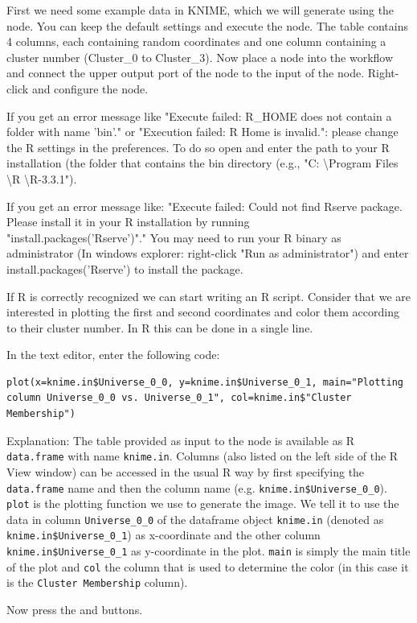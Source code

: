 \begin{task}
First we need some example data in KNIME, which we will generate using the  node. You can keep the default settings and execute the node. The table contains 4 columns, each containing random coordinates and one column containing a cluster number (Cluster\_0 to Cluster\_3). Now place a  node into the workflow and connect the upper output port of the  node to the input of the  node.
Right-click and configure the node.

If you get an error message like "Execute failed: R\_HOME does not contain a folder with name 'bin'." or "Execution failed: R Home is invalid.": please change the R settings in the preferences. To do so open  and enter the path to your R installation (the folder that contains the bin directory (e.g., "C: \textbackslash Program Files \textbackslash R \textbackslash R-3.3.1").

If you get an error message like:
"Execute failed: Could not find Rserve package. Please install it in your R installation by running \\ "install.packages('Rserve')"." You may need to run your R binary as administrator (In windows explorer: right-click "Run as administrator") and enter install.packages('Rserve') to install the package.

If R is correctly recognized we can start writing an R script. Consider that we are interested in plotting the first and second coordinates and color them according to their cluster number. In R this can be done in a single line.

In the  text editor, enter the following code:
\begin{lstlisting}
plot(x=knime.in$Universe_0_0, y=knime.in$Universe_0_1, main="Plotting column Universe_0_0 vs. Universe_0_1", col=knime.in$"Cluster Membership")
\end{lstlisting}
        
Explanation:
The table provided as input to the  node is available as R \texttt{data.frame} with name \texttt{knime.in}. Columns (also listed on the left side of the R View window) can be accessed in the usual R way by first specifying the \texttt{data.frame} name and then the column name (e.g. \texttt{knime.in\$Universe\_0\_0}).
\texttt{plot} is the plotting function we use to generate the image. We tell it to use the data in column \texttt{Universe\_0\_0} of the dataframe object \texttt{knime.in} (denoted as \texttt{knime.in\$Universe\_0\_1}) as x-coordinate and the other column \texttt{knime.in\$Universe\_0\_1} as y-coordinate in the plot. \texttt{main} is simply the main title of the plot and \texttt{col} the column that is used to determine the color (in this case it is the \texttt{Cluster Membership} column).

Now press the  and  buttons.
\end{task}


